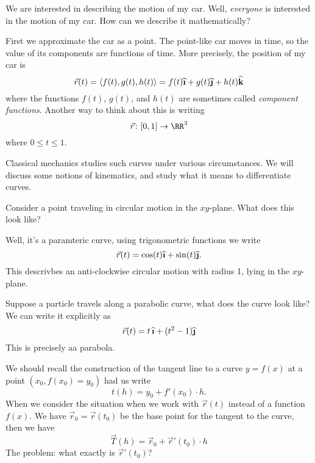 We are interested in describing the motion of my car. Well,
\emph{everyone} is interested in the motion of my car. How can we
describe it mathematically? 

First we approximate the car as a point. The point-like car moves
in time, so the value of its components are functions of
time. More precisely, the position of my car is 
\begin{equation}
\vec{r}(t) = \langle f(t),g(t),h(t)\rangle =
f(t)\widehat{\textbf{\i}} +
g(t)\widehat{\textbf{\j}} +
h(t)\widehat{\textbf{k}}
\end{equation}
where the functions $f(t)$, $g(t)$, and $h(t)$ are sometimes
called \emph{component functions}. Another way to think about
this is writing
\begin{equation}
\vec{r}\colon[0,1]\to\RR^{3}
\end{equation}
where $0\leq t\leq1$. 

Classical mechanics studies such curves under various
circumstances. We will discuss some notions of kinematics, and
study what it means to differentiate curves.

\begin{example}
Consider a point traveling in circular motion in the
$xy$-plane. What does this look like? 

Well, it's a paramteric curve, using trigonometric functions we write
\begin{equation}
\vec{r}(t) = \cos(t)\widehat{\textbf{\i}}+\sin(t)\widehat{\textbf{\j}}.
\end{equation}
This descrivbes an anti-clockwise circular motion with radius 1,
lying in the $xy$-plane.
\end{example}

\begin{example}
Suppose a particle travels along a parabolic curve, what does the
curve look like? We can write it explicitly as
\begin{equation}
\vec{r}(t) =
t\,\widehat{\textbf{\i}}+(t^{2}-1)\widehat{\textbf{\j}}
\end{equation}
This is precisely aa parabola.
\end{example}

We should recall the construction of the tangent line to a curve
$y=f(x)$ at a point $(x_{0},f(x_{0})=y_{0})$ had us write
\begin{equation}
t(h) = y_{0} + f'(x_{0}) \cdot h.
\end{equation}
When we consider the situation when we work with $\vec{r}(t)$
instead of a function $f(x)$. We have
$\vec{r}_{0}=\vec{r}(t_{0})$ be the base point for the tangent to
the curve, then we have
\begin{equation}
\vec{T}(h) = \vec{r}_{0} + \vec{r}'(t_{0})\cdot h
\end{equation}
The problem: what exactly is $\vec{r}'(t_{0})$?

